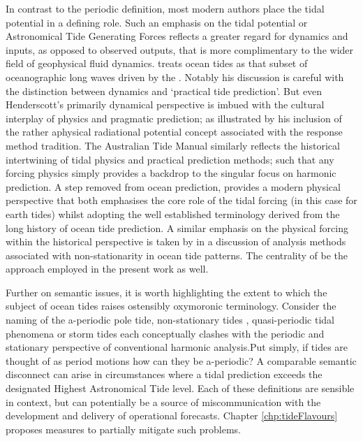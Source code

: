 In contrast to the periodic definition, most modern authors place the tidal potential in a defining role. Such an emphasis on the tidal potential or Astronomical Tide Generating Forces \ATGP{} reflects a greater regard for dynamics and inputs, as opposed to observed outputs, that is more complimentary to the wider field of geophysical fluid dynamics.  
\citet{Hendershott:1981ub} treats ocean tides as that subset of oceanographic long waves driven by the \ATGP{}.  Notably his discussion is careful with the distinction between dynamics and `practical tide prediction'. But even Henderscott's primarily dynamical perspective is imbued with the cultural interplay of physics and pragmatic prediction; as illustrated by his inclusion of the rather aphysical radiational potential concept associated with the \citet{Munk:1966ts} response method tradition.
The Australian Tide Manual \citep{PCTMSL-sp9} similarly reflects the historical intertwining of tidal physics and practical prediction methods; such that any forcing physics simply provides a backdrop to the singular focus on harmonic prediction.   
A step removed from ocean prediction, \citet{agnew2015} provides a modern physical perspective that both emphasises the core role of the tidal forcing (in this case for earth tides) whilst adopting the well established terminology derived from the long history of ocean tide prediction. A similar emphasis on the physical forcing within the historical perspective is taken by \citet{Flinchem:2000kp} in a  discussion of analysis methods associated with non-stationarity in ocean tide patterns.
The centrality of \ATGP{} be the approach employed in the present work as well.


Further on semantic issues, it is worth highlighting the extent to which the subject of ocean tides raises ostensibly oxymoronic terminology.  
Consider the naming of the a-periodic pole tide, non-stationary tides \citep{Ray:2011tj}, quasi-periodic tidal phenomena \citep{Flinchem:2000kp} or storm tides \citep{Horsburgh:2008gw} each conceptually clashes with the periodic and stationary perspective of conventional harmonic analysis.Put simply, if tides are thought of as period motions how can they be a-periodic?  
A comparable semantic disconnect can arise in circumstances where a tidal prediction exceeds the designated Highest Astronomical Tide level.   
Each of these definitions are sensible in context, but can potentially be a source of miscommunication with the development and delivery of operational forecasts.    Chapter \ref{chp:tideFlavours} proposes measures to partially mitigate such problems.

